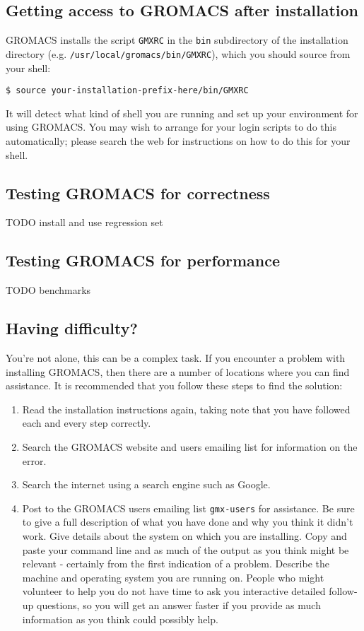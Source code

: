 \documentclass{article}[12pt,a4paper,twoside]
\newcommand{\gromacs}{GROMACS}
\begin{document}
\subsection{Getting access to \gromacs{} after installation}

\gromacs{} installs the script \texttt{GMXRC} in the \texttt{bin}
subdirectory of the installation directory
(e.g. \texttt{/usr/local/gromacs/bin/GMXRC}), which you should source
from your shell:
\begin{verbatim}
$ source your-installation-prefix-here/bin/GMXRC
\end{verbatim}

It will detect what kind of shell you are running and
set up your environment for using \gromacs{}. You may wish to arrange
for your login scripts to do this automatically; please search the web
for instructions on how to do this for your shell.

\subsection{Testing \gromacs{} for correctness}
TODO install and use regression set

\subsection{Testing \gromacs{} for performance}
TODO benchmarks

\subsection{Having difficulty?}

You're not alone, this can be a complex task. If you encounter a
problem with installing \gromacs{}, then there are a number of
locations where you can find assistance. It is recommended that you
follow these steps to find the solution:

\begin{enumerate}
\item Read the installation instructions again, taking note that you
  have followed each and every step correctly.
\item Search the \gromacs{} website and users emailing list for
  information on the error.
\item Search the internet using a search engine such as Google.
\item Post to the \gromacs{} users emailing list \texttt{gmx-users}
  for assistance. Be sure to give a full description of what you have
  done and why you think it didn't work. Give details about the system
  on which you are installing. Copy and paste your command line and as
  much of the output as you think might be relevant - certainly from
  the first indication of a problem. Describe the machine and
  operating system you are running on. People who might volunteer to
  help you do not have time to ask you interactive detailed follow-up
  questions, so you will get an answer faster if you provide as much
  information as you think could possibly help.
\end{enumerate}
\end{document}
